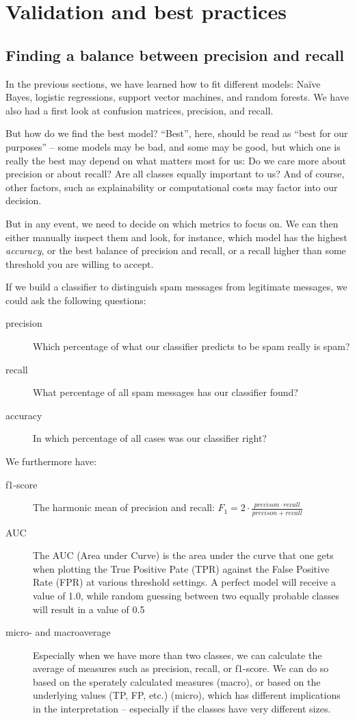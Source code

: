 \section{Validation and best practices}
\label{sec:validation}
\subsection{Finding a balance between precision and recall}
In the previous sections, we have learned how to fit different models:
Na\"ive Bayes, logistic regressions, support vector machines, and
random forests.  We have also had a first look at confusion matrices,
precision, and recall.

But how do we find the best model? ``Best'', here, should be read as
``best for our purposes'' -- some models may be bad, and some may be
good, but which one is really the best may depend on what matters most
for us: Do we care more about precision or about recall? Are all
classes equally important to us?  And of course, other factors, such
as explainability or computational costs may factor into our decision.
 
But in any event, we need to decide on which metrics to focus on.  We can
then either manually inspect them and look, for instance, which model
has the highest \emph{accuracy}, or the best balance of precision and recall,
or a recall higher than some threshold you are willing to accept.

If we build a classifier to distinguish spam messages from legitimate
messages, we could ask the following questions:
\begin{description}
\item[precision] Which percentage of what our classifier predicts to be
  spam really is spam?
\item[recall]{What percentage of all spam messages has our classifier
  found?}
\item[accuracy]{In which percentage of all cases was our classifier
  right?}
\end{description}

We furthermore have:
\begin{description}
\item[f1-score]{The harmonic mean of precision and recall: $F_1 = 2
  \cdot \frac{precison \cdot recall}{precison + recall}$}
\item[AUC]{The AUC (Area under Curve) is the area under the curve that
  one gets when plotting the True Positive Pate (TPR) against the
  False Positive Rate (FPR) at various threshold settings. A perfect
  model will receive a value of 1.0, while random guessing between two
  equally probable classes will result in a value of 0.5}
\item[micro- and macroaverage]{Especially when we have more than two
  classes, we can calculate the average of measures such as precision,
  recall, or f1-score. We can do so based on the sperately calculated
  measures (macro), or based on the underlying values (TP, FP, etc.)
  (micro), which has different implications in the interpretation --
  especially if the classes have very different sizes.}
\end{description}


